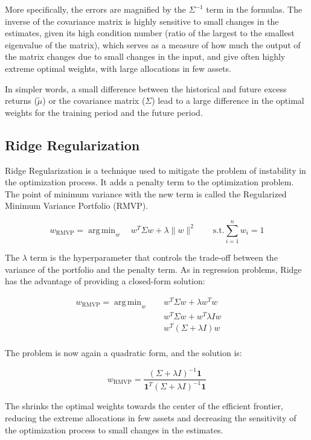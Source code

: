 \documentclass{article}
\DeclareMathOperator*{\argmin}{arg\,min}
\begin{document}
More specifically, the errors are magnified by the $\Sigma^{-1}$ term in the formulas. The inverse of the covariance matrix is highly sensitive to small changes in the estimates, given its high condition number (ratio of the largest to the smallest eigenvalue of the matrix), which serves as a measure of how much the output of the matrix changes due to small changes in the input, and give often highly extreme optimal weights, with large allocations in few assets.

In simpler words, a small difference between the historical and future excess returns ($\tilde{\mu}$) or the covariance matrix ($\Sigma$) lead to a large difference in the optimal weights for the training period and the future period.

\subsection{Ridge Regularization}
Ridge Regularization is a technique used to mitigate the problem of instability in the optimization process. It adds a penalty term to the optimization problem. The point of minimum variance with the new term is called the Regularized Minimum Variance Portfolio (RMVP).

$$
w_{\text{RMVP}} = \argmin_{w} \quad w^{T} \Sigma w + \lambda \|w\|^{2} \quad \quad
\text{s.t.} \sum_{i=1}^{n} w_{i} = 1
$$

The $\lambda$ term is the hyperparameter that controls the trade-off between the variance of the portfolio and the penalty term. As in regression problems, Ridge has the advantage of providing a closed-form solution:

\begin{align*}
w_{\text{RMVP}} = \argmin_{w} & \quad w^{T} \Sigma w + \lambda w^T w \quad \quad \\
                & \quad w^{T} \Sigma w + w^T \lambda I w \quad \quad \\
                & \quad w^{T} (\Sigma + \lambda I) w \quad \quad \\
\end{align*}

The problem is now again a quadratic form, and the solution is:

$$
w_{\text{RMVP}} = \frac{(\Sigma + \lambda I)^{-1} \mathbf{1}}{\mathbf{1}^{T} (\Sigma + \lambda I)^{-1} \mathbf{1}}
$$

The shrinks the optimal weights towards the center of the efficient frontier, reducing the extreme allocations in few assets and decreasing the sensitivity of the optimization process to small changes in the estimates.
\end{document}

